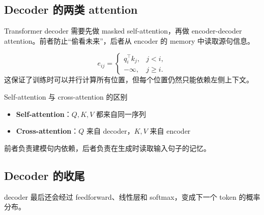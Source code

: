 \documentclass[a4paper]{article}
\begin{document}
\subsection{Decoder 的两类 attention}

Transformer decoder 需要先做 masked self-attention，再做 encoder-decoder attention。前者防止“偷看未来”，后者从 encoder 的 memory 中读取源句信息。













\[
e_{ij} =
\begin{cases}
q_i^\top k_j, & j < i, \\
-\infty, & j \ge i.
\end{cases}
\]
这保证了训练时可以并行计算所有位置，但每个位置仍然只能依赖左侧上下文。









\begin{knowledgebox}{Self-attention 与 cross-attention 的区别}
\begin{itemize}
    \item \textbf{Self-attention}：$Q,K,V$ 都来自同一序列
    \item \textbf{Cross-attention}：$Q$ 来自 decoder，$K,V$ 来自 encoder
\end{itemize}
前者负责建模句内依赖，后者负责在生成时读取输入句子的记忆。
\end{knowledgebox}

\subsection{Decoder 的收尾}

decoder 最后还会经过 feedforward、线性层和 softmax，变成下一个 token 的概率分布。










\end{document}
